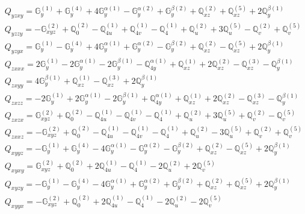 \documentclass[fleqn,8pt,landscape]{jsarticle}
\begin{document}
\begin{align*}
& Q_{yzxy} = \mathbb{G}_{y}^{(1)} + \mathbb{G}_{y}^{(4)} + 4 \mathbb{G}_{y}^{\alpha(1)} - \mathbb{G}_{y}^{\alpha(2)} + \mathbb{G}_{y}^{\beta(2)} + \mathbb{Q}_{xz}^{(2)} + \mathbb{Q}_{xz}^{(5)} + 2 \mathbb{Q}_{y}^{\beta(1)} \\
& Q_{yzzy} = - \mathbb{G}_{xyz}^{(2)} + \mathbb{Q}_{0}^{(2)} - \mathbb{Q}_{4u}^{(1)} + \mathbb{Q}_{4v}^{(1)} - \mathbb{Q}_{4}^{(1)} + \mathbb{Q}_{u}^{(2)} + 3 \mathbb{Q}_{u}^{(5)} - \mathbb{Q}_{v}^{(2)} + \mathbb{Q}_{v}^{(5)} \\
& Q_{yzyx} = \mathbb{G}_{y}^{(1)} - \mathbb{G}_{y}^{(4)} + 4 \mathbb{G}_{y}^{\alpha(1)} + \mathbb{G}_{y}^{\alpha(2)} - \mathbb{G}_{y}^{\beta(2)} + \mathbb{Q}_{xz}^{(2)} - \mathbb{Q}_{xz}^{(5)} + 2 \mathbb{Q}_{y}^{\beta(1)} \\
& Q_{zxxx} = 2 \mathbb{G}_{y}^{(1)} - 2 \mathbb{G}_{y}^{\alpha(1)} - 2 \mathbb{G}_{y}^{\beta(1)} - \mathbb{Q}_{4y}^{\alpha(1)} + \mathbb{Q}_{xz}^{(1)} + 2 \mathbb{Q}_{xz}^{(2)} - \mathbb{Q}_{xz}^{(3)} - \mathbb{Q}_{y}^{\beta(1)} \\
& Q_{zxyy} = 4 \mathbb{G}_{y}^{\beta(1)} + \mathbb{Q}_{xz}^{(1)} - \mathbb{Q}_{xz}^{(3)} + 2 \mathbb{Q}_{y}^{\beta(1)} \\
& Q_{zxzz} = - 2 \mathbb{G}_{y}^{(1)} + 2 \mathbb{G}_{y}^{\alpha(1)} - 2 \mathbb{G}_{y}^{\beta(1)} + \mathbb{Q}_{4y}^{\alpha(1)} + \mathbb{Q}_{xz}^{(1)} + 2 \mathbb{Q}_{xz}^{(2)} - \mathbb{Q}_{xz}^{(3)} - \mathbb{Q}_{y}^{\beta(1)} \\
& Q_{zxzx} = \mathbb{G}_{xyz}^{(2)} + \mathbb{Q}_{0}^{(2)} - \mathbb{Q}_{4u}^{(1)} - \mathbb{Q}_{4v}^{(1)} - \mathbb{Q}_{4}^{(1)} + \mathbb{Q}_{u}^{(2)} + 3 \mathbb{Q}_{u}^{(5)} + \mathbb{Q}_{v}^{(2)} - \mathbb{Q}_{v}^{(5)} \\
& Q_{zxxz} = - \mathbb{G}_{xyz}^{(2)} + \mathbb{Q}_{0}^{(2)} - \mathbb{Q}_{4u}^{(1)} - \mathbb{Q}_{4v}^{(1)} - \mathbb{Q}_{4}^{(1)} + \mathbb{Q}_{u}^{(2)} - 3 \mathbb{Q}_{u}^{(5)} + \mathbb{Q}_{v}^{(2)} + \mathbb{Q}_{v}^{(5)} \\
& Q_{xyyz} = - \mathbb{G}_{y}^{(1)} + \mathbb{G}_{y}^{(4)} - 4 \mathbb{G}_{y}^{\alpha(1)} - \mathbb{G}_{y}^{\alpha(2)} - \mathbb{G}_{y}^{\beta(2)} + \mathbb{Q}_{xz}^{(2)} - \mathbb{Q}_{xz}^{(5)} + 2 \mathbb{Q}_{y}^{\beta(1)} \\
& Q_{xyxy} = \mathbb{G}_{xyz}^{(2)} + \mathbb{Q}_{0}^{(2)} + 2 \mathbb{Q}_{4u}^{(1)} - \mathbb{Q}_{4}^{(1)} - 2 \mathbb{Q}_{u}^{(2)} + 2 \mathbb{Q}_{v}^{(5)} \\
& Q_{xyzy} = - \mathbb{G}_{y}^{(1)} - \mathbb{G}_{y}^{(4)} - 4 \mathbb{G}_{y}^{\alpha(1)} + \mathbb{G}_{y}^{\alpha(2)} + \mathbb{G}_{y}^{\beta(2)} + \mathbb{Q}_{xz}^{(2)} + \mathbb{Q}_{xz}^{(5)} + 2 \mathbb{Q}_{y}^{\beta(1)} \\
& Q_{xyyx} = - \mathbb{G}_{xyz}^{(2)} + \mathbb{Q}_{0}^{(2)} + 2 \mathbb{Q}_{4u}^{(1)} - \mathbb{Q}_{4}^{(1)} - 2 \mathbb{Q}_{u}^{(2)} - 2 \mathbb{Q}_{v}^{(5)}
\end{align*}
\end{document}
